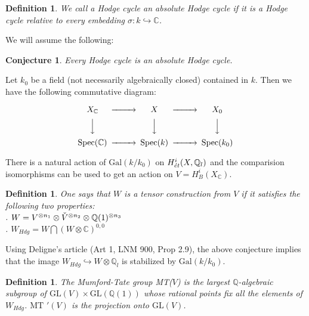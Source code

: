 \documentclass[12pt,titlepage]{article}
\newtheorem{definition}[lem]{Definition}
\newtheorem{conjecture}[lem]{Conjecture}
\begin{document}
\begin{definition}
   We call a Hodge cycle an \emph{absolute Hodge cycle} if it is a Hodge cycle relative to every embedding
   $\sigma : k \hookrightarrow \mathbb{C}$.
\end{definition}

We will assume the following:

\begin{conjecture}\label{AH}
   Every Hodge cycle is an absolute Hodge cycle.
\end{conjecture}

Let $k_0$ be a field (not necessarily algebraically closed) contained in $k$.  Then we have the following commutative diagram:

\[
\begin{CD}
  X_{\mathbb{C}}            @>>> X              @>>> X_0\\
    @VVV                      @VVV                @VVV\\
  \text{Spec}(\mathbb{C})   @>>>\text{Spec}(k)  @>>>\text{Spec}(k_0)\\
\end{CD}
\]

There is a natural action of $\text{Gal}(k/k_0)$ on
$H^{i}_{\Acute{e}t}(X,\mathbb{Q}_{l})$ and the comparision isomorphisms
can be used to get an action on $V=H^{i}_{B}(X_{\mathbb{C}})$.

\begin{definition}
   One says that $W$ is a \emph{tensor construction} from $V$ if it satisfies the following two properties:\\
    .  $W = V^{\otimes n_1} \otimes \Check{V}^{\otimes n_2} \otimes \mathbb{Q}(1)^{\otimes n_3}$\\
    .  $W_{Hdg} = W \bigcap (W \otimes \mathbb{C})^{0,0}$
\end{definition}

Using Deligne's article (Art 1, LNM 900, Prop 2.9), the above conjecture implies that
the image $W_{Hdg} \hookrightarrow W\otimes \mathbb{Q}_{l}$ is stabilized by $\text{Gal}(k/k_0)$.

\begin{definition}
  The \emph{Mumford-Tate group MT($V$)} is the largest $\mathbb{Q}$-algebraic subgroup of
  $\text{GL}(V) \times \text{GL}(\mathbb{Q}(1))$ whose rational points fix all the elements of $W_{Hdg}$. $\text{MT }'(V)$
  is the projection onto $\text{GL}(V)$.
\end{definition}
\end{document}
